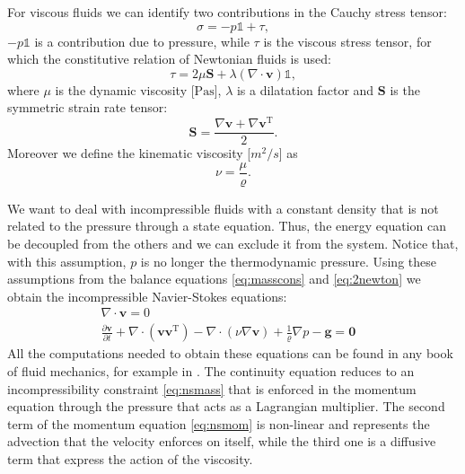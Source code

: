 For viscous fluids we can identify two contributions in the Cauchy stress 
tensor:
\begin{equation}
\sigma = -p\mathbb{1} + \tau,
\end{equation}
$-p\mathbb{1}$ is a contribution due to pressure, while $\tau$ is 
the viscous stress tensor, for which the constitutive relation of Newtonian 
fluids is used:
\begin{equation}
\tau = 2\mu \mathbf{S} + 
\lambda (\nabla \cdot \mathbf{v}) \mathbb{1},
\end{equation}
where $\mu$ is the dynamic viscosity [$\si{\pascal\second}$], $\lambda$ 
is a dilatation factor and $\mathbf{S}$ is the symmetric strain rate tensor:
\begin{equation*}
\mathbf{S} = \frac{\nabla \mathbf{v} + \nabla \mathbf{v}^\mathrm{T}}{2}.
\end{equation*} 
Moreover we define the kinematic viscosity 
[$\si{m^2/s}$] as
\begin{equation}
\nu = \frac{\mu}{\varrho}.
\end{equation}

We want to deal with incompressible fluids with a constant density that is not 
related to the pressure through a state equation. Thus, the 
energy equation can be decoupled from the others and we can exclude it from 
the system. 
Notice that, with this assumption, $p$ is no longer the thermodynamic pressure.
Using these assumptions from the balance equations 
\eqref{eq:masscons} and \eqref{eq:2newton} we obtain the incompressible Navier-Stokes 
equations:
\begin{align}
\label{eq:nsmass} \nabla \cdot \mathbf{v} = 0&\\
\label{eq:nsmom} \frac{\partial \mathbf{v}}{\partial t} + \nabla 
\cdot (\mathbf{v} \mathbf{v}^\mathrm{T}) - \nabla \cdot (\nu \nabla 
\mathbf{v}) + \frac{1}{\varrho}\nabla p  -\mathbf{g} = \mathbf{0}&
\end{align}
All the computations needed to obtain these equations can be found in any book 
of fluid mechanics, for example in \cite{main:vermal}. The continuity equation 
reduces to an incompressibility constraint \eqref{eq:nsmass} that is enforced 
in the momentum equation through the pressure that acts as a Lagrangian 
multiplier. The second term of the momentum equation \eqref{eq:nsmom} is 
non-linear and represents the advection that the velocity enforces on itself, 
while the third one is a diffusive term that express the action of the 
viscosity.
%
